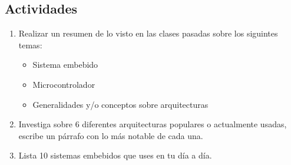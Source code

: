\documentclass[11pt,letterpaper]{article}
\begin{document}
\subsection*{Actividades}
\begin{enumerate}[label=\arabic*)]
    \item Realizar un resumen de lo visto en las clases pasadas sobre los siguintes temas:
    \begin{itemize}
        \item Sistema embebido
        \item Microcontrolador
        \item Generalidades y/o conceptos sobre arquitecturas 
    \end{itemize}
    \item Investiga sobre 6 diferentes arquitecturas populares o actualmente usadas, escribe un párrafo con lo más notable de cada una.
    \item Lista 10 sistemas embebidos que uses en tu día a día.
\end{enumerate}


    
    
    
    
  
\end{document}
